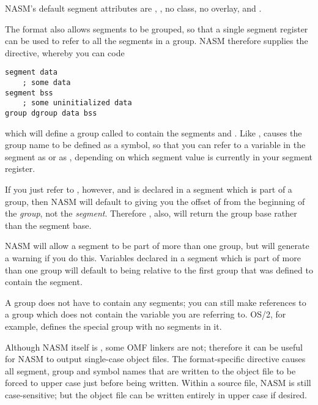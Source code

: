 NASM's default segment attributes are , , no
class, no overlay, and .


The  format also allows segments to be grouped, so that a
single segment register can be used to refer to all the segments in
a group. NASM therefore supplies the  directive, whereby
you can code

\begin{lstlisting}
segment data
    ; some data
segment bss
    ; some uninitialized data
group dgroup data bss
\end{lstlisting}

which will define a group called  to contain the segments
 and . Like ,  causes
the group name to be defined as a symbol, so that you can refer to
a variable  in the  segment as 
or as , depending on which segment value is
currently in your segment register.

If you just refer to , however, and  is declared
in a segment which is part of a group, then NASM will default to giving
you the offset of  from the beginning of the \emph{group},
not the \emph{segment}. Therefore , also, will return
the group base rather than the segment base.

NASM will allow a segment to be part of more than one group, but
will generate a warning if you do this. Variables declared in a
segment which is part of more than one group will default to being
relative to the first group that was defined to contain the segment.

A group does not have to contain any segments; you can still make
 references to a group which does not contain the variable
you are referring to. OS/2, for example, defines the special group
 with no segments in it.


Although NASM itself is , some OMF linkers are
not; therefore it can be useful for NASM to output single-case
object files. The  format-specific directive causes all
segment, group and symbol names that are written to the object file
to be forced to upper case just before being written. Within a
source file, NASM is still case-sensitive; but the object file can
be written entirely in upper case if desired.

